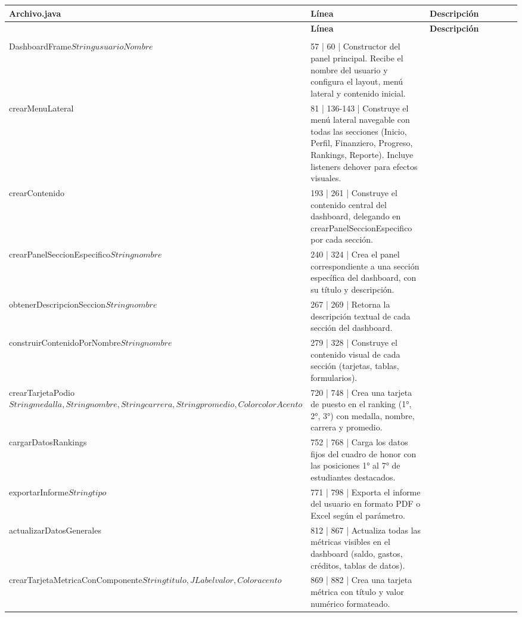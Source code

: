 \documentclass[utf8]{article}
\begin{document}
\begin{longtable}{p{0.18\linewidth}p{0.32\linewidth}p{0.5\linewidth}}
\hline
\textbf{Archivo.java} & \textbf{Línea} & \textbf{Descripción} \\ \hline
\endfirsthead}
\hline
\textbf{Archivo.java} & \textbf{Línea} & \textbf{Descripción} \\ \hline
\endhead}
\hline
\endfoot}
\textbf{DashboardFrame.java} & & \\ \hline
DashboardFrame\(String usuarioNombre\) & 57 | 60 | Constructor del panel principal. Recibe el nombre del usuario y configura el layout, menú lateral y contenido inicial. \\
crearMenuLateral\(\) & 81 | 136-143 | Construye el menú lateral navegable con todas las secciones (Inicio, Perfil, Finanziero, Progreso, Rankings, Reporte). Incluye listeners dehover para efectos visuales. \\
crearContenido\(\) & 193 | 261 | Construye el contenido central del dashboard, delegando en crearPanelSeccionEspecifico por cada sección. \\
crearPanelSeccionEspecifico\(String nombre\) & 240 | 324 | Crea el panel correspondiente a una sección específica del dashboard, con su título y descripción. \\
obtenerDescripcionSeccion\(String nombre\) & 267 | 269 | Retorna la descripción textual de cada sección del dashboard. \\
construirContenidoPorNombre\(String nombre\) & 279 | 328 | Construye el contenido visual de cada sección (tarjetas, tablas, formularios). \\
crearTarjetaPodio\(String medalla, String nombre, String carrera, String promedio, Color colorAcento\) & 720 | 748 | Crea una tarjeta de puesto en el ranking (1°, 2°, 3°) con medalla, nombre, carrera y promedio. \\
cargarDatosRankings\(\) & 752 | 768 | Carga los datos fijos del cuadro de honor con las posiciones 1° al 7° de estudiantes destacados. \\
exportarInforme\(String tipo\) & 771 | 798 | Exporta el informe del usuario en formato PDF o Excel según el parámetro. \\
actualizarDatosGenerales\(\) & 812 | 867 | Actualiza todas las métricas visibles en el dashboard (saldo, gastos, créditos, tablas de datos). \\
crearTarjetaMetricaConComponente\(String titulo, JLabel valor, Color acento\) & 869 | 882 | Crea una tarjeta métrica con título y valor numérico formateado. \\

\end{longtable}
\end{document}
